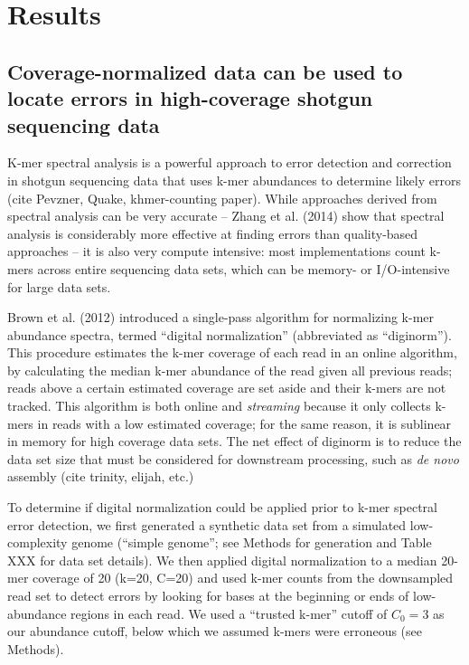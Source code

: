 



\section{Results}

\subsection{Coverage-normalized data can be used to locate
errors in high-coverage shotgun sequencing data}

K-mer spectral analysis is a powerful approach to error detection and
correction in shotgun sequencing data that uses k-mer abundances to
determine likely errors (cite Pevzner, Quake, khmer-counting paper).
While approaches derived from spectral analysis can be very accurate
-- Zhang et al. (2014) show that spectral analysis is considerably
more effective at finding errors than quality-based approaches -- it
is also very compute intensive: most implementations count k-mers
across entire sequencing data sets, which can be memory- or
I/O-intensive for large data sets.

Brown et al. (2012) introduced a single-pass algorithm for normalizing
k-mer abundance spectra, termed ``digital normalization'' (abbreviated
as ``diginorm'').  This procedure estimates the k-mer coverage of each
read in an online algorithm, by calculating the median k-mer abundance
of the read given all previous reads; reads above a certain estimated
coverage are set aside and their k-mers are not tracked.  This
algorithm is both online and {\em streaming} because it only collects
k-mers in reads with a low estimated coverage; for the same reason, it
is sublinear in memory for high coverage data sets.  The net effect of
diginorm is to reduce the data set size that must be considered for
downstream processing, such as {\em de novo} assembly (cite trinity,
elijah, etc.)

To determine if digital normalization could be applied prior to k-mer
spectral error detection, we first generated a synthetic data set from
a simulated low-complexity genome (``simple genome''; see Methods for
generation and Table XXX for data set details).  We then applied
digital normalization to a median 20-mer coverage of 20 (k=20, C=20)
and used k-mer counts from the downsampled read set to detect errors
by looking for bases at the beginning or ends of low-abundance regions
in each read. We used a ``trusted k-mer'' cutoff of $C_0 = 3$ as our
abundance cutoff, below which we assumed k-mers were erroneous (see Methods).

